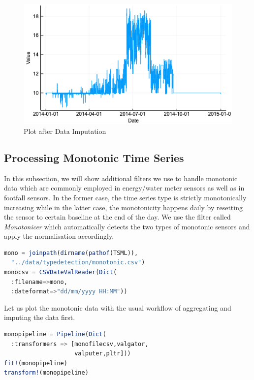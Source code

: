 \documentclass{juliacon}
\begin{document}
\begin{figure}[htbp]
   \centering
   \includegraphics[width=\columnwidth]{amplot.png} %
   \caption{Plot after Data Imputation}
   \label{fig:amplot}
\end{figure}

\subsection{Processing Monotonic Time Series}
In this subsection, we will show additional filters we use to handle monotonic data which are commonly employed in energy/water meter sensors as well as in footfall sensors. In the former case, the time series type is strictly monotonically increasing while in the latter case, the monotonicity happens daily by resetting the sensor to certain baseline at the end of the day. We use the filter called \emph{Monotonicer} which automatically detects the two types of monotonic sensors and apply the normalisation accordingly. 

\begin{lstlisting}[language = Julia]
mono = joinpath(dirname(pathof(TSML)),
  "../data/typedetection/monotonic.csv")
monocsv = CSVDateValReader(Dict(
  :filename=>mono,
  :dateformat=>"dd/mm/yyyy HH:MM"))
\end{lstlisting}

Let us plot the monotonic data with the usual workflow of aggregating and imputing the data first.

\begin{lstlisting}[language = Julia]
monopipeline = Pipeline(Dict(
  :transformers => [monofilecsv,valgator,
                    valputer,pltr]))
fit!(monopipeline)
transform!(monopipeline)
\end{lstlisting}
\end{document}
